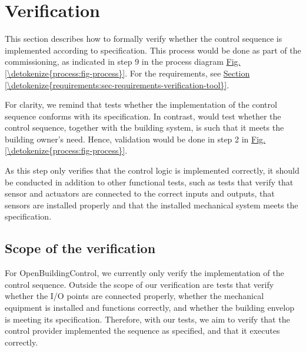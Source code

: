 \documentclass[letterpaper,10pt, openany,english]{sphinxmanual}
\begin{document}
\chapter{Verification}
\label{\detokenize{verification:verification}}\label{\detokenize{verification:sec-verification}}\label{\detokenize{verification::doc}}
This section describes how to formally verify whether
the control sequence is implemented according to specification.
This process would be done as part
of the commissioning, as indicated in step 9 in the process diagram
\hyperref[\detokenize{process:fig-process}]{Fig.\@ \ref{\detokenize{process:fig-process}}}.
For the requirements, see \hyperref[\detokenize{requirements:sec-requirements-verification-tool}]{Section \ref{\detokenize{requirements:sec-requirements-verification-tool}}}.

For clarity, we remind that  tests whether the implementation
of the control sequence conforms with its specification. In contrast,
 would test whether the control sequence,
together with the building system,
is such that it meets the building owner’s need. Hence,
validation would be done in step 2 in \hyperref[\detokenize{process:fig-process}]{Fig.\@ \ref{\detokenize{process:fig-process}}}.

As this step only verifies that the control logic is implemented correctly,
it should be conducted in addition to other functional tests,
such as tests that verify that sensor and actuators are connected to the
correct inputs and outputs, that sensors are installed properly and
that the installed mechanical system meets the specification.


\section{Scope of the verification}
\label{\detokenize{verification:scope-of-the-verification}}
For OpenBuildingControl, we currently only verify the implementation of the control
sequence. Outside the scope of our verification are tests
that verify whether the I/O points are connected properly,
whether the mechanical equipment is installed and functions correctly,
and whether the building envelop is meeting its specification.
Therefore, with our tests, we aim to verify that the control provider
implemented the sequence as specified, and that it executes correctly.
\end{document}
